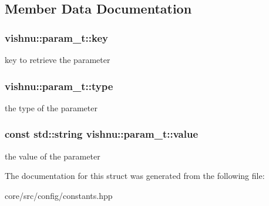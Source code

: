 \subsection{Member Data Documentation}
\hypertarget{structvishnu_1_1param__t_aa5ddc5895c65c3e15565c237767fe854}{
\subsubsection[{key}]{ {\bf vishnu::param\_\-t::key}}}
\label{structvishnu_1_1param__t_aa5ddc5895c65c3e15565c237767fe854}
key to retrieve the parameter \hypertarget{structvishnu_1_1param__t_aea92abf3252828b48153b811a9396b2b}{
\subsubsection[{type}]{ {\bf vishnu::param\_\-t::type}}}
\label{structvishnu_1_1param__t_aea92abf3252828b48153b811a9396b2b}
the type of the parameter \hypertarget{structvishnu_1_1param__t_a0e0ab5147d45a0534874278b4b0d0b61}{
\subsubsection[{value}]{\setlength{\rightskip}{0pt plus 5cm}const std::string {\bf vishnu::param\_\-t::value}}}
\label{structvishnu_1_1param__t_a0e0ab5147d45a0534874278b4b0d0b61}
the value of the parameter 

The documentation for this struct was generated from the following file:\begin{DoxyCompactItemize}
\item 
core/src/config/constants.hpp\end{DoxyCompactItemize}
